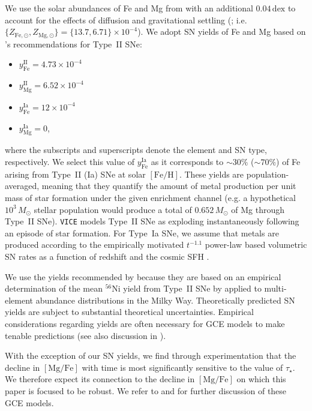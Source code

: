 \documentclass[twocolumn]{aastex631}
\newcommand{\Msun}{\ensuremath{M_{\odot}}}
\newcommand{\FeH}{\ensuremath{[\textrm{Fe}/\textrm{H}]}}
\newcommand{\MgFe}{\ensuremath{[\textrm{Mg}/\textrm{Fe}]}}
\newcommand{\dex}{\ensuremath{\textrm{dex}}}
\begin{document}
We use the solar abundances of Fe and Mg from \citet{Magg2022} with an additional $0.04\,\dex$ to account for the effects of diffusion and gravitational settling (\citealt{Turcotte1998}; i.e. $\{Z_{\text{Fe},\odot}, Z_{\text{Mg},\odot}\} = \{13.7, 6.71\} \times 10^{-4}$). We adopt SN yields of Fe and Mg based on \citeauthor{Weinberg2023}'s \citeyearpar{Weinberg2023} recommendations for Type~II SNe:
\begin{itemize}

	\item $y_\text{Fe}^\text{II} = 4.73 \times 10^{-4}$

	\item $y_\text{Mg}^\text{II} = 6.52 \times 10^{-4}$

	\item $y_\text{Fe}^\text{Ia} = 12 \times 10^{-4}$

	\item $y_\text{Mg}^\text{Ia} = 0$,

\end{itemize}
where the subscripts and superscripts denote the element and SN type, respectively. We select this value of $y_\text{Fe}^\text{Ia}$ as it corresponds to $\sim30\%$ ($\sim70\%$) of Fe arising from Type~II (Ia) SNe at solar \FeH{}. These yields are population-averaged, meaning that they quantify the amount of metal production per unit mass of star formation under the given enrichment channel (e.g. a hypothetical $10^3\,\Msun$ stellar population would produce a total of $0.652\,\Msun$ of Mg through Type~II SNe). {\tt VICE} models Type~II SNe as exploding instantaneously following an episode of star formation. For Type~Ia SNe, we assume that metals are produced according to the empirically motivated $t^{-1.1}$ power-law based volumetric SN rates as a function of redshift and the cosmic SFH \citep[e.g.][]{Maoz2012}.

We use the yields recommended by \citet{Weinberg2023} because they are based on an empirical determination of the mean $^{56}$Ni yield from Type~II SNe by \citet{Rodriguez2021, Rodriguez2023} applied to multi-element abundance distributions in the Milky Way. Theoretically predicted SN yields \citep[e.g.][]{Seitenzahl2013, Sukhbold2016, Limongi2018, Gronow2021} are subject to substantial theoretical uncertainties. Empirical considerations regarding yields are often necessary for GCE models to make tenable predictions (see also discussion in \citealt{Palla2022}).

With the exception of our SN yields, we find through experimentation that the decline in \MgFe{} with time is most significantly sensitive to the value of $\tau_\star$. We therefore expect its connection to the decline in \MgFe{} on which this paper is focused to be robust. We refer to \citet{2020MNRAS.498.1364J} and \citet{2022arXiv220402989C} for further discussion of these GCE models.
\end{document}
